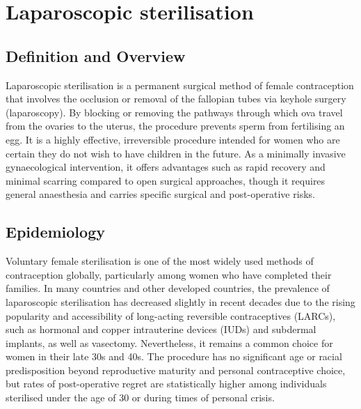 \chapter{Laparoscopic sterilisation}

\section*{Definition and Overview}
Laparoscopic sterilisation is a permanent surgical method of female contraception that involves the occlusion or removal of the fallopian tubes via keyhole surgery (laparoscopy). By blocking or removing the pathways through which ova travel from the ovaries to the uterus, the procedure prevents sperm from fertilising an egg. It is a highly effective, irreversible procedure intended for women who are certain they do not wish to have children in the future. As a minimally invasive gynaecological intervention, it offers advantages such as rapid recovery and minimal scarring compared to open surgical approaches, though it requires general anaesthesia and carries specific surgical and post-operative risks.

\section*{Epidemiology}
Voluntary female sterilisation is one of the most widely used methods of contraception globally, particularly among women who have completed their families. In many countries and other developed countries, the prevalence of laparoscopic sterilisation has decreased slightly in recent decades due to the rising popularity and accessibility of long-acting reversible contraceptives (LARCs), such as hormonal and copper intrauterine devices (IUDs) and subdermal implants, as well as vasectomy. Nevertheless, it remains a common choice for women in their late 30s and 40s. The procedure has no significant age or racial predisposition beyond reproductive maturity and personal contraceptive choice, but rates of post-operative regret are statistically higher among individuals sterilised under the age of 30 or during times of personal crisis.

